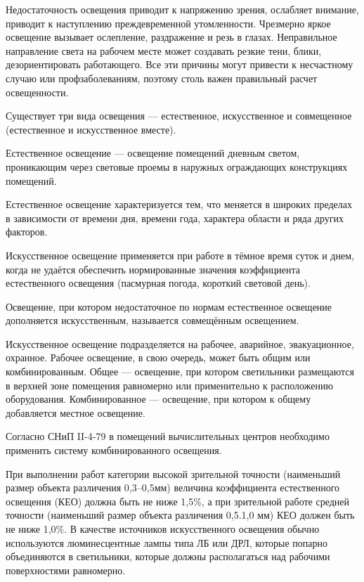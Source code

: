 Недостаточность освещения приводит к напряжению зрения, ослабляет внимание, приводит к наступлению преждевременной утомленности. 
Чрезмерно яркое освещение вызывает ослепление, раздражение и резь в глазах.
Неправильное направление света на рабочем месте может создавать резкие тени, блики, дезориентировать работающего.
Все эти причины могут привести к несчастному случаю или профзаболеваниям, поэтому столь важен правильный расчет освещенности.

Существует три вида освещения --- естественное, искусственное и совмещенное (естественное и искусственное вместе).

Естественное освещение --- освещение помещений дневным светом, проникающим через световые проемы в наружных ограждающих конструкциях помещений.

Естественное освещение характеризуется тем, что меняется в широких пределах в зависимости от времени дня, времени года, характера области и ряда других факторов.

Искусственное освещение применяется при работе в тёмное время суток и днем, когда не удаётся обеспечить нормированные значения коэффициента естественного освещения (пасмурная погода, короткий световой день).

Освещение, при котором недостаточное по нормам естественное освещение дополняется искусственным, называется совмещённым освещением.

Искусственное освещение подразделяется на рабочее, аварийное, эвакуационное, охранное. Рабочее освещение, в свою очередь, может быть общим или комбинированным. Общее --- освещение, при котором светильники размещаются в верхней зоне помещения равномерно или применительно к расположению оборудования. Комбинированное --- освещение, при котором к общему добавляется местное освещение.

Согласно СНиП II-4-79 в помещений вычислительных центров необходимо применить систему комбинированного освещения.

При выполнении работ категории высокой зрительной точности (наименьший размер объекта различения 0,3--0,5мм) величина коэффициента естественного освещения (КЕО) должна быть не ниже 1,5\%, а при зрительной работе средней точности (наименьший размер объекта различения 0,5.1,0 мм) КЕО должен быть не ниже 1,0\%. В качестве источников искусственного освещения обычно используются люминесцентные лампы типа ЛБ или ДРЛ, которые попарно объединяются в светильники, которые должны располагаться над рабочими поверхностями равномерно.


